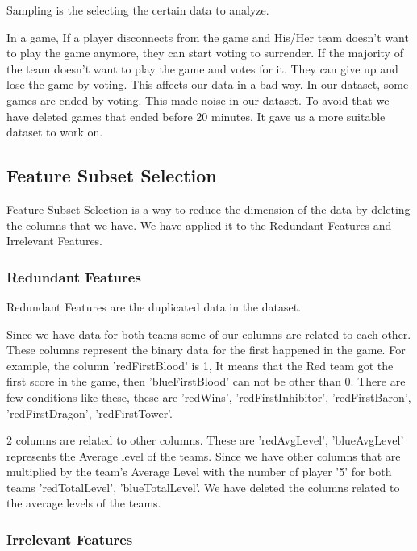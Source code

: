 \documentclass[a4paper]{article}
\begin{document}
Sampling is the selecting the certain data to analyze.

\bigskip 

In a game, If a player disconnects from the game and His/Her team doesn't want to play the game anymore, they can start voting to surrender. If the majority of the team doesn't want to play the game and votes for it. They can give up and lose the game by voting.
This affects our data in a bad way. In our dataset, some games are ended by voting. This made noise in our dataset. To avoid that we have deleted games that ended before 20 minutes. It gave us a more suitable dataset to work on. 

\subsection{Feature Subset Selection}

Feature Subset Selection is a way to reduce the dimension of the data by deleting the columns that we have. We have applied it to the Redundant Features and Irrelevant Features.

\bigskip 

\subsubsection{Redundant Features}

Redundant Features are the duplicated data in the dataset. 

\medskip

Since we have data for both teams some of our columns are related to each other. These columns represent the binary data for the first happened in the game. For example, the column 'redFirstBlood' is 1, It means that the Red team got the first score in the game, then 'blueFirstBlood' can not be other than 0. There are few conditions like these, these are 'redWins', 'redFirstInhibitor', 'redFirstBaron', 'redFirstDragon', 'redFirstTower'.


\medskip

2 columns are related to other columns. These are 'redAvgLevel', 'blueAvgLevel' represents the Average level of the teams. Since we have other columns that are multiplied by the team's Average Level with the number of player '5' for both teams 'redTotalLevel', 'blueTotalLevel'. We have deleted the columns related to the average levels of the teams.



\bigskip 

\subsubsection{Irrelevant  Features}
\end{document}
